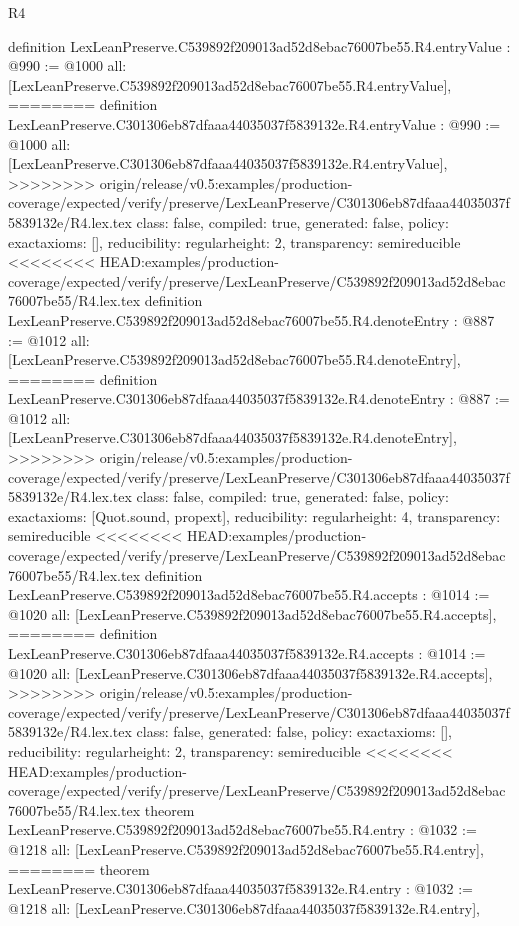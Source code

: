 \begin{lexlean}{R4}
\begin{coremodule}
{{{{{{{{{{{{{{definition LexLeanPreserve.C539892f209013ad52d8ebac76007be55.R4.entryValue : @990 := @1000 {
  all: [LexLeanPreserve.C539892f209013ad52d8ebac76007be55.R4.entryValue],
========
definition LexLeanPreserve.C301306eb87dfaaa44035037f5839132e.R4.entryValue : @990 := @1000 {
  all: [LexLeanPreserve.C301306eb87dfaaa44035037f5839132e.R4.entryValue],
>>>>>>>> origin/release/v0.5:examples/production-coverage/expected/verify/preserve/LexLeanPreserve/C301306eb87dfaaa44035037f5839132e/R4.lex.tex
  class: false,
  compiled: true,
  generated: false,
  policy: exact{axioms: []},
  reducibility: regular{height: 2},
  transparency: semireducible
}
<<<<<<<< HEAD:examples/production-coverage/expected/verify/preserve/LexLeanPreserve/C539892f209013ad52d8ebac76007be55/R4.lex.tex
definition LexLeanPreserve.C539892f209013ad52d8ebac76007be55.R4.denoteEntry : @887 := @1012 {
  all: [LexLeanPreserve.C539892f209013ad52d8ebac76007be55.R4.denoteEntry],
========
definition LexLeanPreserve.C301306eb87dfaaa44035037f5839132e.R4.denoteEntry : @887 := @1012 {
  all: [LexLeanPreserve.C301306eb87dfaaa44035037f5839132e.R4.denoteEntry],
>>>>>>>> origin/release/v0.5:examples/production-coverage/expected/verify/preserve/LexLeanPreserve/C301306eb87dfaaa44035037f5839132e/R4.lex.tex
  class: false,
  compiled: true,
  generated: false,
  policy: exact{axioms: [Quot.sound, propext]},
  reducibility: regular{height: 4},
  transparency: semireducible
}
<<<<<<<< HEAD:examples/production-coverage/expected/verify/preserve/LexLeanPreserve/C539892f209013ad52d8ebac76007be55/R4.lex.tex
definition LexLeanPreserve.C539892f209013ad52d8ebac76007be55.R4.accepts : @1014 := @1020 {
  all: [LexLeanPreserve.C539892f209013ad52d8ebac76007be55.R4.accepts],
========
definition LexLeanPreserve.C301306eb87dfaaa44035037f5839132e.R4.accepts : @1014 := @1020 {
  all: [LexLeanPreserve.C301306eb87dfaaa44035037f5839132e.R4.accepts],
>>>>>>>> origin/release/v0.5:examples/production-coverage/expected/verify/preserve/LexLeanPreserve/C301306eb87dfaaa44035037f5839132e/R4.lex.tex
  class: false,
  generated: false,
  policy: exact{axioms: []},
  reducibility: regular{height: 2},
  transparency: semireducible
}
<<<<<<<< HEAD:examples/production-coverage/expected/verify/preserve/LexLeanPreserve/C539892f209013ad52d8ebac76007be55/R4.lex.tex
theorem LexLeanPreserve.C539892f209013ad52d8ebac76007be55.R4.entry : @1032 := @1218 {
  all: [LexLeanPreserve.C539892f209013ad52d8ebac76007be55.R4.entry],
========
theorem LexLeanPreserve.C301306eb87dfaaa44035037f5839132e.R4.entry : @1032 := @1218 {
  all: [LexLeanPreserve.C301306eb87dfaaa44035037f5839132e.R4.entry],
}}}}}}}}}}}}}}}}}}}
\end{coremodule}
\end{lexlean}
